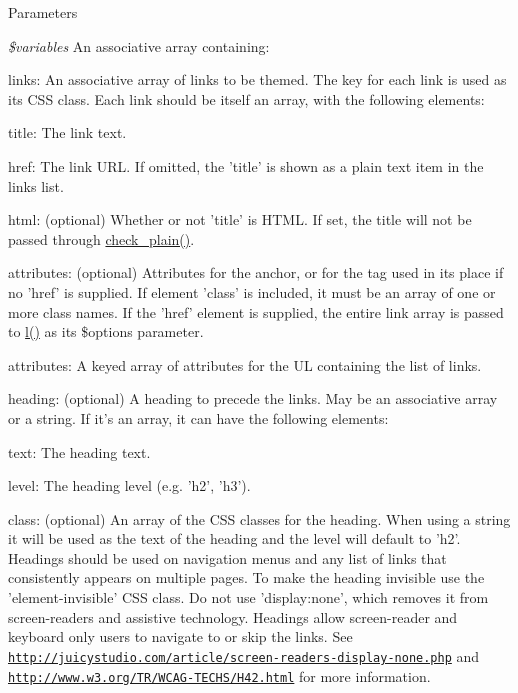 \begin{DoxyParams}{Parameters}
\item[{\em \$variables}]An associative array containing:
\begin{DoxyItemize}
\item links: An associative array of links to be themed. The key for each link is used as its CSS class. Each link should be itself an array, with the following elements:
\begin{DoxyItemize}
\item title: The link text.
\item href: The link URL. If omitted, the 'title' is shown as a plain text item in the links list.
\item html: (optional) Whether or not 'title' is HTML. If set, the title will not be passed through \hyperlink{group__sanitization_ga76fc67a30fd8d75ddd80565e6e65a13d}{check\_\-plain()}.
\item attributes: (optional) Attributes for the anchor, or for the  tag used in its place if no 'href' is supplied. If element 'class' is included, it must be an array of one or more class names. If the 'href' element is supplied, the entire link array is passed to \hyperlink{common_8inc_ad3b36c06dc46250b8d22b8d0d2e7bd97}{l()} as its \$options parameter.
\end{DoxyItemize}
\item attributes: A keyed array of attributes for the UL containing the list of links.
\item heading: (optional) A heading to precede the links. May be an associative array or a string. If it's an array, it can have the following elements:
\begin{DoxyItemize}
\item text: The heading text.
\item level: The heading level (e.g. 'h2', 'h3').
\item class: (optional) An array of the CSS classes for the heading. When using a string it will be used as the text of the heading and the level will default to 'h2'. Headings should be used on navigation menus and any list of links that consistently appears on multiple pages. To make the heading invisible use the 'element-\/invisible' CSS class. Do not use 'display:none', which removes it from screen-\/readers and assistive technology. Headings allow screen-\/reader and keyboard only users to navigate to or skip the links. See \href{http://juicystudio.com/article/screen-readers-display-none.php}{\tt http://juicystudio.com/article/screen-\/readers-\/display-\/none.php} and \href{http://www.w3.org/TR/WCAG-TECHS/H42.html}{\tt http://www.w3.org/TR/WCAG-\/TECHS/H42.html} for more information. 
\end{DoxyItemize}
\end{DoxyItemize}\end{DoxyParams}
